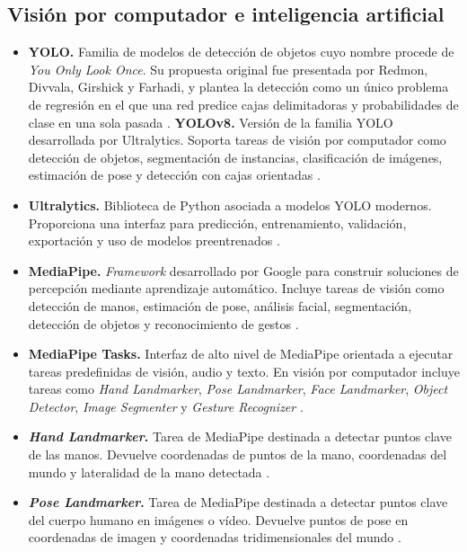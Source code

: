 \subsection{Visión por computador e inteligencia artificial}

\begin{itemize}
	\item \textbf{YOLO.} Familia de modelos de detección de objetos cuyo nombre procede de \textit{You Only Look Once}. Su propuesta original fue presentada por Redmon, Divvala, Girshick y Farhadi, y plantea la detección como un único problema de regresión en el que una red predice cajas delimitadoras y probabilidades de clase en una sola pasada \cite{redmon2016yolo}.
	\textbf{YOLOv8.} Versión de la familia YOLO desarrollada por Ultralytics. Soporta tareas de visión por computador como detección de objetos, segmentación de instancias, clasificación de imágenes, estimación de pose y detección con cajas orientadas \cite{ultralytics_yolov8,ultralytics_tasks}.
	
	\item \textbf{Ultralytics.} Biblioteca de Python asociada a modelos YOLO modernos. Proporciona una interfaz para predicción, entrenamiento, validación, exportación y uso de modelos preentrenados \cite{ultralytics_yolov8}.
	
	\item \textbf{MediaPipe.} \textit{Framework} desarrollado por Google para construir soluciones de percepción mediante aprendizaje automático. Incluye tareas de visión como detección de manos, estimación de pose, análisis facial, segmentación, detección de objetos y reconocimiento de gestos \cite{lugaresi2019mediapipe,google_mediapipe_docs}.
	
	\item \textbf{MediaPipe Tasks.} Interfaz de alto nivel de MediaPipe orientada a ejecutar tareas predefinidas de visión, audio y texto. En visión por computador incluye tareas como \textit{Hand Landmarker}, \textit{Pose Landmarker}, \textit{Face Landmarker}, \textit{Object Detector}, \textit{Image Segmenter} y \textit{Gesture Recognizer} \cite{google_mediapipe_docs}.
	
	\item \textbf{\textit{Hand Landmarker}.} Tarea de MediaPipe destinada a detectar puntos clave de las manos. Devuelve coordenadas de puntos de la mano, coordenadas del mundo y lateralidad de la mano detectada \cite{mediapipe_hand_landmarker}.
	
	\item \textbf{\textit{Pose Landmarker}.} Tarea de MediaPipe destinada a detectar puntos clave del cuerpo humano en imágenes o vídeo. Devuelve puntos de pose en coordenadas de imagen y coordenadas tridimensionales del mundo \cite{mediapipe_pose_landmarker}.
	

\end{itemize}
